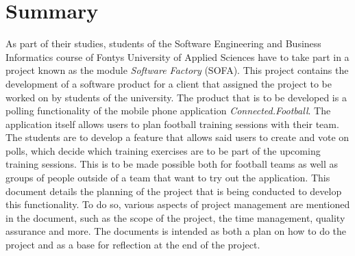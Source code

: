 \section*{Summary}

As part of their studies, students of the Software Engineering and Business Informatics course of Fontys University of Applied Sciences have to take part in a project known as the module \textit{Software Factory} (SOFA). This project contains the development of a software product for a client that assigned the project to be worked on by students of the university.
\newline
The product that is to be developed is a polling functionality of the mobile phone application \textit{Connected.Football}. The application itself allows users to plan football training sessions with their team. The students are to develop a feature that allows said users to create and vote on polls, which decide which training exercises are to be part of the upcoming training sessions. This is to be made possible both for football teams as well as groups of people outside of a team that want to try out the application.
\newline
This document details the planning of the project that is being conducted to develop this functionality. To do so, various aspects of project management are mentioned in the document, such as the scope of the project, the time management, quality assurance and more. The documents is intended as both a plan on how to do the project and as a base for reflection at the end of the project.